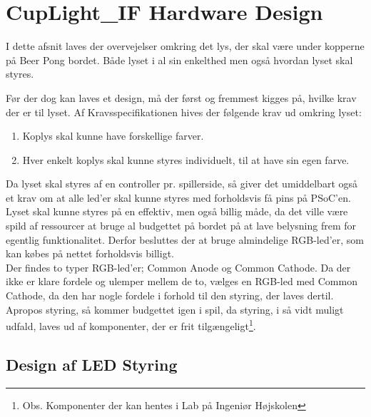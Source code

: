 \documentclass[Softwaredesign/Softwaredesign_main.tex]{subfiles}
\begin{document}
\section{CupLight\_IF Hardware Design}
 I dette afsnit laves der overvejelser omkring det lys, der skal være under kopperne på Beer Pong bordet. Både lyset i al sin enkelthed men også hvordan lyset skal styres.
 
 
Før der dog kan laves et design, må der først og fremmest kigges på, hvilke krav der er til lyset. Af Kravsspecifikationen hives der følgende krav ud omkring lyset:
\begin{enumerate}
    \item Koplys skal kunne have forskellige farver.
    \item Hver enkelt koplys skal kunne styres individuelt, til at have sin egen farve.
\end{enumerate}
Da lyset skal styres af en controller pr. spillerside, så giver det umiddelbart også et krav om at alle led'er skal kunne styres med forholdsvis få pins på PSoC'en. 
\\Lyset skal kunne styres på en effektiv, men også billig måde, da det ville være spild af ressourcer at bruge al budgettet på bordet på at lave belysning frem for egentlig funktionalitet. Derfor besluttes der at bruge almindelige RGB-led'er, som kan købes på nettet forholdsvis billigt. 
\\Der findes to typer RGB-led'er; Common Anode og Common Cathode. Da der ikke er klare fordele og ulemper mellem de to, vælges en RGB-led med Common Cathode, da den har nogle fordele i forhold til den styring, der laves dertil.
\\Apropos styring, så kommer budgettet igen i spil, da styring, i så vidt muligt udfald, laves ud af komponenter, der er frit tilgængeligt\footnote{Obs. Komponenter der kan hentes i Lab på Ingeniør Højskolen}. 

\subsection{Design af LED Styring}
\end{document}
